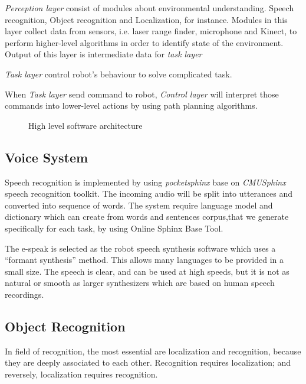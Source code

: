 \documentclass{llncs}
\newcommand{\dq}[1]{``#1''}
\begin{document}
\textit{Perception layer} consist of modules about environmental understanding. Speech recognition, Object recognition and Localization, for instance. Modules in this layer collect data from sensors, i.e. laser range finder, microphone and Kinect, to perform higher-level algorithms in order to identify state of the environment. Output of this layer is intermediate data for \textit{task layer}

\textit{Task layer} control robot's behaviour to solve complicated task.

When \textit{Task layer} send command to robot, \textit{Control layer} will interpret those commands into lower-level actions by using path planning algorithms.

\begin{figure}
\centering
\caption{High level software architecture}
\label{fig:soft_arc}
\end{figure}

\subsection{Voice System}

Speech recognition is implemented by using \textit{pocketsphinx} base on \textit{CMUSphinx} speech recognition toolkit. The incoming audio will be split into utterances and converted into sequence of words. The system require language model and dictionary which can create from words and sentences corpus,that we generate specifically for each task, by using Online Sphinx Base Tool.

The e-speak is selected as the robot speech synthesis software which uses a \dq{formant synthesis} method. This allows many languages to be provided in a small size. The speech is clear, and can be used at high speeds, but it is not as natural or smooth as larger synthesizers which are based on human speech recordings.

\subsection{Object Recognition}
    In field of recognition, the most essential are localization and recognition, because they are deeply associated to each other. Recognition requires localization; and reversely, localization requires recognition.
    
\end{document}
